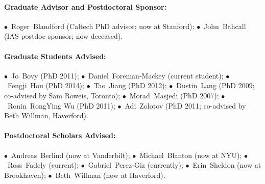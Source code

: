 \documentclass[letterpaper,12pt]{article}
\begin{document}
\paragraph{Graduate Advisor and Postdoctoral Sponsor:}
$\bullet$~Roger~Blandford (Caltech PhD advisor; now at Stanford);
$\bullet$~John~Bahcall (IAS postdoc sponsor; now deceased).

\paragraph{Graduate Students Advised:}
$\bullet$~Jo~Bovy (PhD 2011);
$\bullet$~Daniel~Foreman-Mackey (current student);
$\bullet$~Fengji~Hou (PhD 2014);
$\bullet$~Tao~Jiang (PhD 2012);
$\bullet$~Dustin~Lang (PhD 2009; co-advised by Sam Roweis, Toronto);
$\bullet$~Morad~Masjedi (PhD 2007);
$\bullet$~Ronin~RongYing Wu (PhD 2011);
$\bullet$~Adi~Zolotov (PhD 2011; co-advised by Beth Willman, Haverford).

\paragraph{Postdoctoral Scholars Advised:}
$\bullet$~Andreas~Berlind (now at Vanderbilt);
$\bullet$~Michael~Blanton (now at NYU);
$\bullet$~Ross~Fadely (current);
$\bullet$~Gabriel~Perez-Giz (currently);
$\bullet$~Erin~Sheldon (now at Brookhaven);
$\bullet$~Beth~Willman (now at Haverford).
\end{document}
